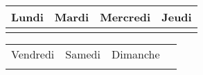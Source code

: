 \documentclass[11pt,a6paper,landscape]{article} %
\newlength{\blankcellsheight}
\newlength{\daycellwidth}
\begin{document}
\begin{tabular}{|*{4}{p{\daycellwidth}|}} \hline
Lundi & Mardi & Mercredi & Jeudi \\ \hline
\vspace{\blankcellsheight}\phantom{x} & & & \\ \hline
\end{tabular}

\begin{tabular}{|*{4}{p{\daycellwidth}|}} \hline
Vendredi & Samedi & Dimanche &  \\ \cline{1-3}
\vspace{\blankcellsheight}\phantom{x} & & & \\ \hline
\end{tabular}
\end{document}
